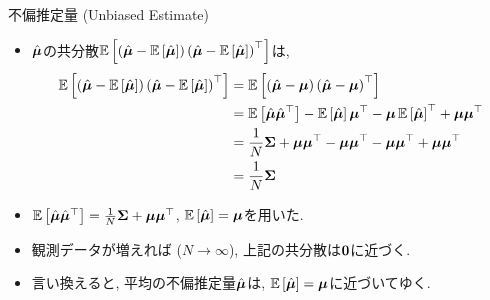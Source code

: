 \documentclass[dvipdfmx,notheorems,t]{beamer}
\begin{document}
\begin{frame}{不偏推定量 (Unbiased Estimate)}
\begin{itemize}
  \item $\hat{\vb*{\mu}}$の共分散$\operatorname{\mathbb{E}} \left[ \left( \hat{\vb*{\mu}} - \operatorname{\mathbb{E}} \left[ \hat{\vb*{\mu}} \right] \right)
  \left( \hat{\vb*{\mu}} - \operatorname{\mathbb{E}} \left[ \hat{\vb*{\mu}} \right] \right)^\top \right]$は,
  {\small \begin{align*}
    \operatorname{\mathbb{E}} \left[ \left( \hat{\vb*{\mu}} - \operatorname{\mathbb{E}} \left[ \hat{\vb*{\mu}} \right] \right)
      \left( \hat{\vb*{\mu}} - \operatorname{\mathbb{E}} \left[ \hat{\vb*{\mu}} \right] \right)^\top \right]
    &= \operatorname{\mathbb{E}} \left[ \left( \hat{\vb*{\mu}} - \vb*{\mu} \right) \left( \hat{\vb*{\mu}} - \vb*{\mu} \right)^\top \right] \\
    &= \operatorname{\mathbb{E}} \left[ \hat{\vb*{\mu}} \hat{\vb*{\mu}}^\top \right]
      - \operatorname{\mathbb{E}} \left[ \hat{\vb*{\mu}} \right] \vb*{\mu}^\top - \vb*{\mu} \operatorname{\mathbb{E}} \left[ \hat{\vb*{\mu}} \right]^\top
      + \vb*{\mu} \vb*{\mu}^\top \\
    &= \frac{1}{N} \vb{\Sigma} + \vb*{\mu} \vb*{\mu}^\top
      - \vb*{\mu} \vb*{\mu}^\top - \vb*{\mu} \vb*{\mu}^\top
      + \vb*{\mu} \vb*{\mu}^\top \\
    &= \frac{1}{N} \vb{\Sigma}
  \end{align*}}
  \item $\operatorname{\mathbb{E}} \left[ \hat{\vb*{\mu}} \hat{\vb*{\mu}}^\top \right] = \frac{1}{N} \vb{\Sigma} + \vb*{\mu} \vb*{\mu}^\top$,
  $\operatorname{\mathbb{E}} \left[ \hat{\vb*{\mu}} \right] = \vb*{\mu}$を用いた.
  \item 観測データが増えれば ($N \to \infty$), 上記の共分散は$\vb{0}$に近づく.
  \item 言い換えると, 平均の不偏推定量$\hat{\vb*{\mu}}$は, $\operatorname{\mathbb{E}} \left[ \hat{\vb*{\mu}} \right] = \vb*{\mu}$に近づいてゆく.
\end{itemize}
\end{frame}
\end{document}
